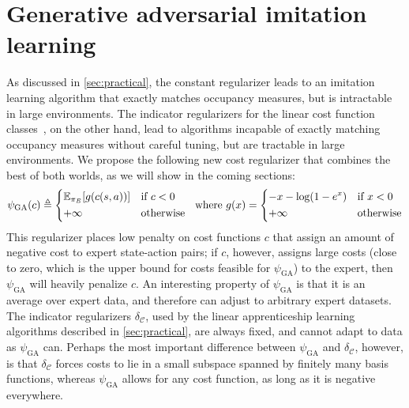 \documentclass{article}
\newcommand\bbE{\ensuremath{\mathbb{E}}} %
\newcommand\psiga{\ensuremath{\psi_\text{GA}}}
\newcommand{\1}{\mathbb{I}} %
\begin{document}
\section{Generative adversarial imitation learning} \label{sec:gail}
As discussed in \cref{sec:practical}, the constant regularizer leads to an imitation learning algorithm that exactly matches occupancy measures, but is intractable in large environments.
The indicator regularizers for the linear cost function classes~, on the other hand, lead to algorithms incapable of exactly matching occupancy measures without careful tuning, but are tractable in large environments.
We propose the following new cost regularizer that combines the best of both worlds, as we will show in the coming sections:
\begin{align} \label{eq:psiga}
\psiga(c) \triangleq \begin{dcases*} \bbE_{\pi_E}[g(c(s,a))] & if $c < 0$ \\ +\infty & otherwise \end{dcases*} \ \text{where}\ g(x) = \begin{dcases*}-x-\log(1-e^x) & if $x < 0$ \\ +\infty & otherwise\end{dcases*}
\end{align}
This regularizer places low penalty on cost functions $c$ that assign an amount of negative cost to expert state-action pairs; if $c$, however, assigns large costs (close to zero, which is the upper bound for costs feasible for $\psiga$) to the expert, then $\psiga$ will heavily penalize $c$.
An interesting property of $\psiga$ is that it is an average over expert data, and therefore can adjust to arbitrary expert datasets.
The indicator regularizers $\delta_\mathcal{C}$, used by the linear apprenticeship learning algorithms described in \cref{sec:practical}, are always fixed, and cannot adapt to data as $\psiga$ can.
Perhaps the most important difference between $\psiga$ and $\delta_\mathcal{C}$, however, is that $\delta_\mathcal{C}$ forces costs to lie in a small subspace spanned by finitely many basis functions, whereas $\psiga$ allows for any cost function, as long as it is negative everywhere.
\end{document}

